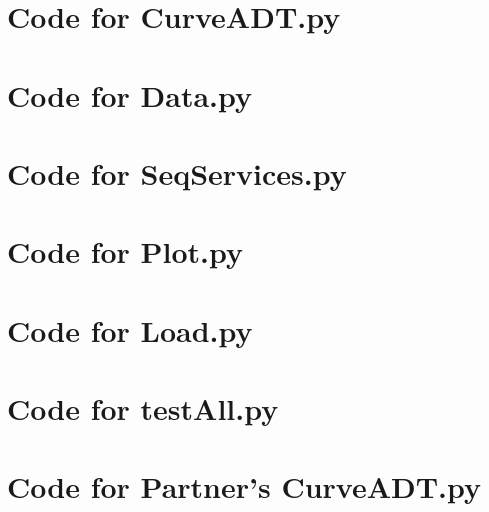 \documentclass[12pt]{article}
\begin{document}
\newpage

\lstset{language=Python, basicstyle=\tiny, breaklines=true, showspaces=false,
  showstringspaces=false, breakatwhitespace=true}

\def\thesection{\Alph{section}}

\section{Code for CurveADT.py}

\noindent 

\newpage

\section{Code for Data.py}

\noindent 

\newpage

\section{Code for SeqServices.py}

\noindent 

\newpage

\section{Code for Plot.py}

\noindent 

\newpage

\section{Code for Load.py}

\noindent 

\newpage

\section{Code for testAll.py}

\noindent 

\newpage


\section{Code for Partner's CurveADT.py}
\end{document}
